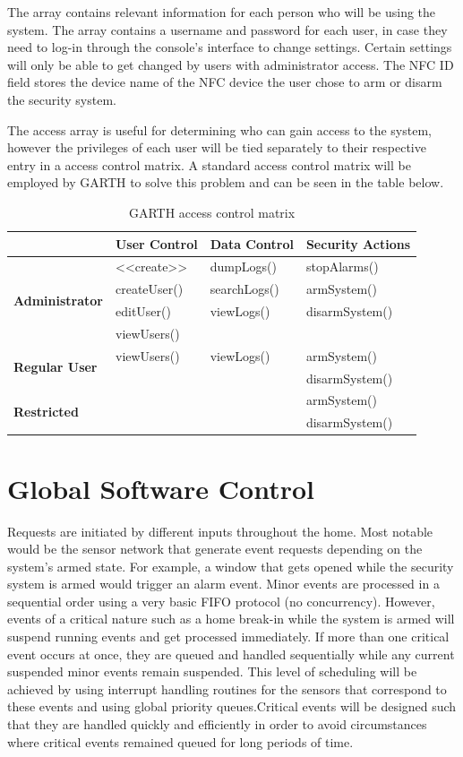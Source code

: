 \documentclass{report}
\begin{document}
The array contains relevant information for each person who will be using the
system. The array contains a username and password for each user, in case
they need to log-in through the console's interface to change settings. Certain
settings will only be able to get changed by users with administrator access.
The NFC ID field stores the device name of the NFC device the user chose to arm
or disarm the security system.

The access array is useful for determining who can gain access to the system,
however the privileges of each user will be tied separately to their respective
entry in a access control matrix. A standard access control matrix will be
employed by GARTH to solve this problem and can be seen in the table below.

\begin{table}[h]
    \caption{GARTH access control matrix}
    \label{access_control}
    \centering
    \begin{tabular}{| l | l | l | l |}
    \hline
    &\textbf{User Control}&\textbf{Data Control}&\textbf{Security Actions} \\ \hline
    \multirow{4}{*}{\textbf{Administrator}}&
    \textless\textless create\textgreater\textgreater&dumpLogs()&stopAlarms() \\
    &createUser()&searchLogs()&armSystem() \\ 
    &editUser()&viewLogs()&disarmSystem() \\
    &viewUsers()&& \\ \hline
    \multirow{2}{*}{\textbf{Regular User}}&viewUsers()&viewLogs()&armSystem() \\
    &&&disarmSystem() \\ \hline
    \multirow{2}{*}{\textbf{Restricted}}&&&armSystem() \\
    &&&disarmSystem() \\
    \hline
    \end{tabular}
\end{table}

\section{Global Software Control}

Requests are initiated by different inputs throughout the home. Most notable
would be the sensor network that generate event requests depending on the
system's armed state. For example, a window that gets opened while the security
system is armed would trigger an alarm event. Minor events are processed in a
sequential order using a very basic FIFO protocol (no concurrency). However,
events of a critical nature such as a home break-in while the system is armed
will suspend running events and get processed immediately. If more than one
critical event occurs at once, they are queued and handled sequentially while
any current suspended minor events remain suspended. This level of scheduling
will be achieved by using interrupt handling routines for the sensors that
correspond to these events and using global priority queues.Critical events
will be designed such that they are handled quickly and efficiently in order to
avoid circumstances where critical events remained queued for long periods of
time.
\end{document}
